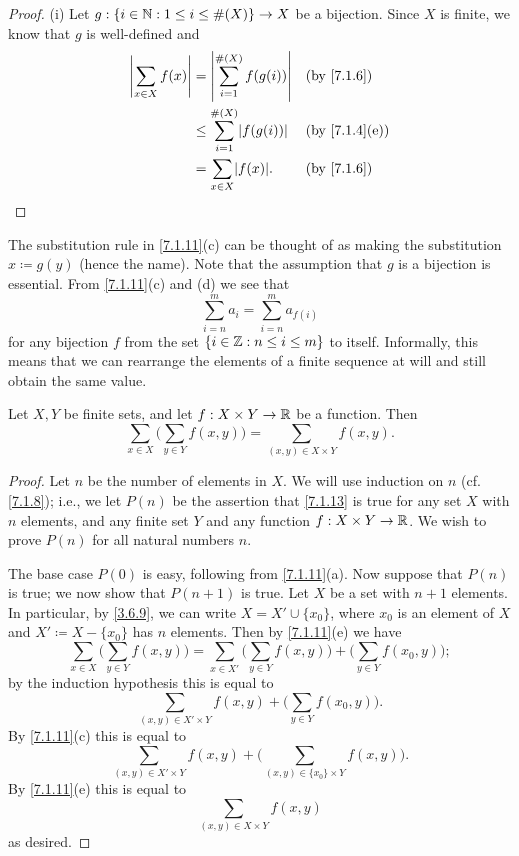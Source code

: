 \begin{proof}{(i)}
  Let \(g : \{i \in \mathbb{N} : 1 \leq i \leq \#(X)\} \to X\) be a bijection.
  Since \(X\) is finite, we know that \(g\) is well-defined and
  \begin{align*}
    \abs{\sum_{x \in X} f(x)} & = \abs{\sum_{i = 1}^{\#(X)} f(g(i))}    &  & \text{(by \cref{7.1.6})}    \\
                              & \leq \sum_{i = 1}^{\#(X)} \abs{f(g(i))} &  & \text{(by \cref{7.1.4}(e))} \\
                              & = \sum_{x \in X} \abs{f(x)}.            &  & \text{(by \cref{7.1.6})}
  \end{align*}
\end{proof}

\begin{rmk}\label{7.1.12}
  The substitution rule in \cref{7.1.11}(c) can be thought of as making the substitution \(x \coloneqq g(y)\) (hence the name).
  Note that the assumption that \(g\) is a bijection is essential.
  From \cref{7.1.11}(c) and (d) we see that
  \[
    \sum_{i = n}^m a_i = \sum_{i = n}^m a_{f(i)}
  \]
  for any bijection \(f\) from the set \(\{i \in \mathbb{Z} : n \leq i \leq m\}\) to itself.
  Informally, this means that we can rearrange the elements of a finite sequence at will and still obtain the same value.
\end{rmk}

\begin{lem}\label{7.1.13}
  Let \(X, Y\) be finite sets, and let \(f : X \times Y \to \mathbb{R}\) be a function.
  Then
  \[
    \sum_{x \in X} \bigg(\sum_{y \in Y} f(x, y)\bigg) = \sum_{(x, y) \in X \times Y} f(x, y).
  \]
\end{lem}

\begin{proof}
  Let \(n\) be the number of elements in \(X\).
  We will use induction on \(n\) (cf. \cref{7.1.8});
  i.e., we let \(P(n)\) be the assertion that \cref{7.1.13} is true for any set \(X\) with \(n\) elements, and any finite set \(Y\) and any function \(f : X \times Y \to \mathbb{R}\).
  We wish to prove \(P(n)\) for all natural numbers \(n\).

  The base case \(P(0)\) is easy, following from \cref{7.1.11}(a).
  Now suppose that \(P(n)\) is true;
  we now show that \(P(n + 1)\) is true.
  Let \(X\) be a set with \(n + 1\) elements.
  In particular, by \cref{3.6.9}, we can write \(X = X' \cup \{x_0\}\), where \(x_0\) is an element of \(X\) and \(X' \coloneqq X - \{x_0\}\) has \(n\) elements.
  Then by \cref{7.1.11}(e) we have
  \[
    \sum_{x \in X} \bigg(\sum_{y \in Y} f(x, y)\bigg) = \sum_{x \in X'} \bigg(\sum_{y \in Y} f(x, y)\bigg) + \bigg(\sum_{y \in Y} f(x_0, y)\bigg);
  \]
  by the induction hypothesis this is equal to
  \[
    \sum_{(x, y) \in X' \times Y} f(x, y) + \bigg(\sum_{y \in Y} f(x_0, y)\bigg).
  \]
  By \cref{7.1.11}(c) this is equal to
  \[
    \sum_{(x, y) \in X' \times Y} f(x, y) + \bigg(\sum_{(x, y) \in \{x_0\} \times Y} f(x, y)\bigg).
  \]
  By \cref{7.1.11}(e) this is equal to
  \[
    \sum_{(x, y) \in X \times Y} f(x, y)
  \]
  as desired.
\end{proof}

